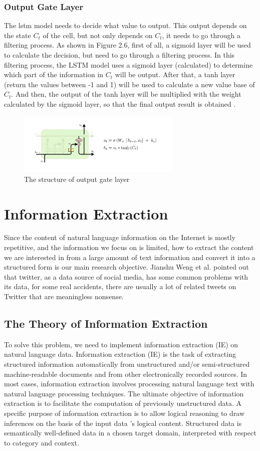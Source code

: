 \subsubsection{Output Gate Layer}
The lstm model needs to decide what value to output. This output depends on the state $C_t$ of the cell, but not only depends on $C_t$, it needs to go through a filtering process. As shown in Figure 2.6, first of all, a sigmoid layer will be used to calculate the decision, but need to go through a filtering process. In this filtering process, the LSTM model uses a sigmoid layer (calculated) to determine which part of the information in $C_{t}$ will be output. After that, a tanh layer (return the values between -1 and 1) will be used to calculate a new value base of $C_{t}$. And then, the output of the tanh layer will be multiplied with the weight calculated by the sigmoid layer, so that the final output result is obtained \cite{LSTM-github}.
\begin{figure}[H]
\centering  %
\includegraphics[width=0.7\textwidth]{output-gate.png}
\caption{The structure of output gate layer}
\end{figure}
\section{Information Extraction} 
\qquad Since the content of natural language information on the Internet is mostly repetitive, and the information we focus on is limited, how to extract the content we are interested in from a large amount of text information and convert it into a structured form is our main research objective. Jianshu Weng et al.\cite{d2015real} pointed out that twitter, as a data source of social media, has some common problems with its data, for some real accidents, there are usually a lot of related tweets on Twitter that are meaningless nonsense.
\subsection{The Theory of Information Extraction} 
To solve this problem, we need to implement information extraction (IE) on natural language data. Information extraction (IE) is the task of extracting structured information automatically from unstructured and/or semi-structured machine-readable documents and from other electronically recorded sources. In most cases, information extraction involves processing natural language text with natural language processing techniques. The ultimate objective of information extraction is to facilitate the computation of previously unstructured data. A specific purpose of information extraction is to allow logical reasoning to draw inferences on the basis of the input data 's logical content. Structured data is semantically well-defined data in a chosen target domain, interpreted with respect to category and context\cite{IE-github}.

